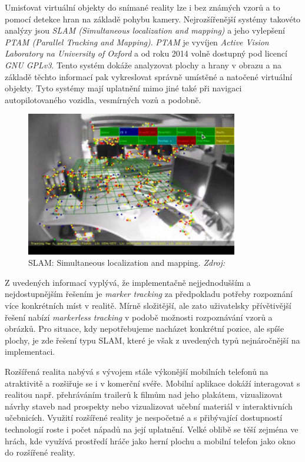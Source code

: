 \documentclass[twoside,12pt]{article}
\begin{document}
Umisťovat virtuální objekty do snímané reality lze i bez známých vzorů a to pomocí detekce hran na základě pohybu kamery. Nejrozšířenější systémy takovéto analýzy jsou \textit{SLAM (Simultaneous localization and mapping)} a jeho vylepšení \textit{PTAM (Parallel Tracking and Mapping)}. \textit{PTAM} je vyvíjen \textit{Active Vision Laboratory na University of Oxford} a od roku 2014 volně dostupný pod licencí \textit{GNU GPLv3}. Tento systém dokáže analyzovat plochy a hrany v obrazu a na základě těchto informací pak vykreslovat správně umístěné a natočené virtuální objekty. Tyto systémy mají uplatnění mimo jiné také při navigaci autopilotovaného vozidla, vesmírných vozů a podobně.

\begin{figure}[H]
    \includegraphics[width=350px, center]{images/slam.jpg}
    
    \caption[]{SLAM: Simultaneous localization and mapping. \textit{Zdroj: \cite{slam}}}
    \label{slam}
\end{figure}

Z uvedených informací vyplývá, že implementačně nejjednodušším a nejdostupnějším řešením je \textit{marker tracking} za předpokladu potřeby rozpoznání více konkrétních míst v realitě. Mírně složitější, ale zato uživatelsky přívětivější řešení nabízí \textit{markerless tracking} v podobě možnosti rozpoznávání vzorů a obrázků. Pro situace, kdy nepotřebujeme nacházet konkrétní pozice, ale spíše plochy, je zde řešení typu SLAM, které je však z uvedených typů nejnáročnější na implementaci.

%
%

Rozšířená realita nabývá s vývojem stále výkonější mobilních telefonů na atraktivitě a rozšiřuje se i v komerční svéře. Mobilní aplikace dokáží interagovat s realitou např. přehráváním trailerů k filmům nad jeho plakátem, vizualizovat návrhy staveb nad prospekty nebo vizualizovat učební materiál v interaktivních učebnicích. Využití rozšířené reality je nespočetné a s přibývající dostupností technologií roste i počet nápadů na její uplatnění. Velké oblibě se těší zejména ve hrách, kde využívá prostředí hráče jako herní plochu a mobilní telefon jako okno do rozšířené reality.
\end{document}
